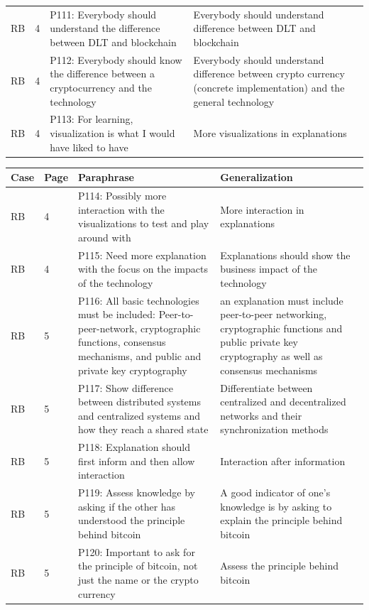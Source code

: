 \begin{table}[H]
\begin{tabularx}{\textwidth}{ll|X|p{4.5cm}}
	RB & 4 & P111: Everybody should understand the difference between DLT and blockchain & Everybody should understand difference between DLT and blockchain     \\  
	RB & 4 & P112: Everybody should know the difference between a cryptocurrency and the technology & Everybody should understand difference between crypto currency (concrete implementation) and the general technology \\ 
	RB & 4 & P113: For learning, visualization is what I would have liked to have & More visualizations in explanations   \\  
	\end{tabularx}
\end{table}

\begin{table}[H]
    \centering
    \begin{tabularx}{\textwidth}{ll|X|p{4.5cm}}
	Case & Page & Paraphrase & Generalization \\ \hline
	RB & 4 & P114: Possibly more interaction with the visualizations to test and play around with & More interaction in explanations   \\  
	RB & 4 & P115: Need more explanation with the focus on the impacts of the technology & Explanations should show the business impact of the technology   \\  
	RB & 5 & P116: All basic technologies must be included: Peer-to-peer-network, cryptographic functions, consensus mechanisms, and public and private key cryptography & an explanation must include peer-to-peer networking, cryptographic functions and public private key cryptography as well as consensus mechanisms   \\  
	RB & 5 & P117: Show difference between distributed systems and centralized systems and how they reach a shared state & Differentiate between centralized and decentralized networks and their synchronization methods   \\  
	RB & 5 & P118: Explanation should first inform and then allow interaction & Interaction after information   \\  
	RB & 5 & P119: Assess knowledge by asking if the other has understood the principle behind bitcoin & A good indicator of one's knowledge is by asking to explain the principle behind bitcoin   \\  
	RB & 5 & P120: Important to ask for the principle of bitcoin, not just the name or the crypto currency & Assess the principle behind bitcoin   \\  

\end{tabularx}
\end{table}
